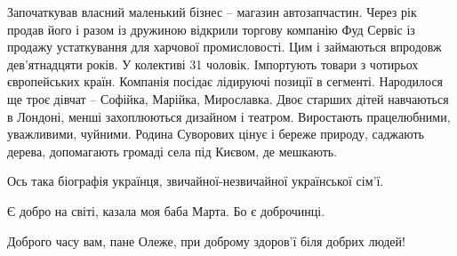 Започаткував власний маленький бізнес – магазин автозапчастин. Через рік продав
його і разом із дружиною відкрили торгову компанію Фуд Сервіс із продажу
устаткування для харчової промисловості. Цим і займаються впродовж
дев’ятнадцяти років. У колективі 31 чоловік. Імпортують товари з чотирьох
європейських країн. Компанія посідає лідируючі позиції в сегменті. Народилося
ще троє дівчат – Софійка, Марійка, Мирославка. Двоє старших дітей навчаються в
Лондоні, менші захоплюються дизайном і театром. Виростають працелюбними,
уважливими, чуйними. Родина Суворових цінує і береже природу, саджають дерева,
допомагають громаді села під Києвом, де мешкають.

Ось така біографія українця, звичайної-незвичайної української сім’ї.

Є добро на світі, казала моя баба Марта. Бо є доброчинці.

Доброго часу вам, пане Олеже, при доброму здоров’ї біля добрих людей!
